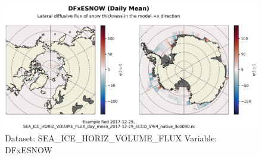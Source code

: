 \begin{figure}[H]
\centering
\includegraphics[width=\textwidth]{../images/plots/native_plots/Sea-Ice_and_Snow_Horizontal_Volume_Fluxes/DFxESNOW.png}
\caption{Dataset: SEA\_ICE\_HORIZ\_VOLUME\_FLUX Variable: DFxESNOW}
\label{tab:table-SEA_ICE_HORIZ_VOLUME_FLUX_DFxESNOW-Plot}
\end{figure}
\pagebreak
